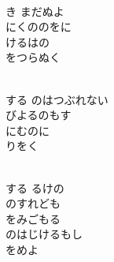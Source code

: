 \documentclass[10pt,b5j]{tarticle} %
\begin{document}
\vspace{1.5em} %
\newcommand{\linespace}{0.5em} %
\newcommand{\blocksize}{0.5\hsize} %
\newcommand{\itemmargin}{3em} %
\begin{enumerate} %
    \setlength{\itemindent}{\itemmargin} %
    \begin{minipage}[c]{\blocksize}
    
        \vspace{\linespace}
        \item~\\
        き まだぬよ\\
        にくののをに\\
        けるはの\\
        をつらぬく
        
    \end{minipage}
    \begin{minipage}[c]{\blocksize}
        
        \vspace{\linespace}
        \item~\\
        する のはつぶれない\\
        びよるのもす\\
        にむのに\\
        りをく
        
    \end{minipage}
    \begin{minipage}[c]{\blocksize}
        
        \vspace{\linespace}
        \item~\\
        する るけの\\
        のすれども\\
        をみごもる\\
        のはじけるもし\\
        をめよ
        

\end{minipage}
\end{enumerate}
\end{document}
